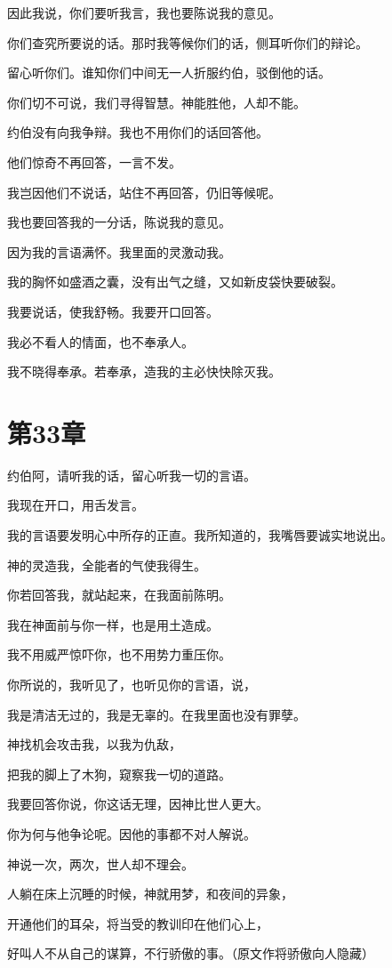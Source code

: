 \documentclass[12pt,oneside]{book}
\begin{document}
因此我说，你们要听我言，我也要陈说我的意见。

你们查究所要说的话。那时我等候你们的话，侧耳听你们的辩论。

留心听你们。谁知你们中间无一人折服约伯，驳倒他的话。

你们切不可说，我们寻得智慧。神能胜他，人却不能。

约伯没有向我争辩。我也不用你们的话回答他。

他们惊奇不再回答，一言不发。

我岂因他们不说话，站住不再回答，仍旧等候呢。

我也要回答我的一分话，陈说我的意见。

因为我的言语满怀。我里面的灵激动我。

我的胸怀如盛酒之囊，没有出气之缝，又如新皮袋快要破裂。

我要说话，使我舒畅。我要开口回答。

我必不看人的情面，也不奉承人。

我不晓得奉承。若奉承，造我的主必快快除灭我。


\chapter{第33章}
约伯阿，请听我的话，留心听我一切的言语。

我现在开口，用舌发言。

我的言语要发明心中所存的正直。我所知道的，我嘴唇要诚实地说出。

神的灵造我，全能者的气使我得生。

你若回答我，就站起来，在我面前陈明。

我在神面前与你一样，也是用土造成。

我不用威严惊吓你，也不用势力重压你。

你所说的，我听见了，也听见你的言语，说，

我是清洁无过的，我是无辜的。在我里面也没有罪孽。

神找机会攻击我，以我为仇敌，

把我的脚上了木狗，窥察我一切的道路。

我要回答你说，你这话无理，因神比世人更大。

你为何与他争论呢。因他的事都不对人解说。

神说一次，两次，世人却不理会。

人躺在床上沉睡的时候，神就用梦，和夜间的异象，

开通他们的耳朵，将当受的教训印在他们心上，

好叫人不从自己的谋算，不行骄傲的事。（原文作将骄傲向人隐藏）
\end{document}
